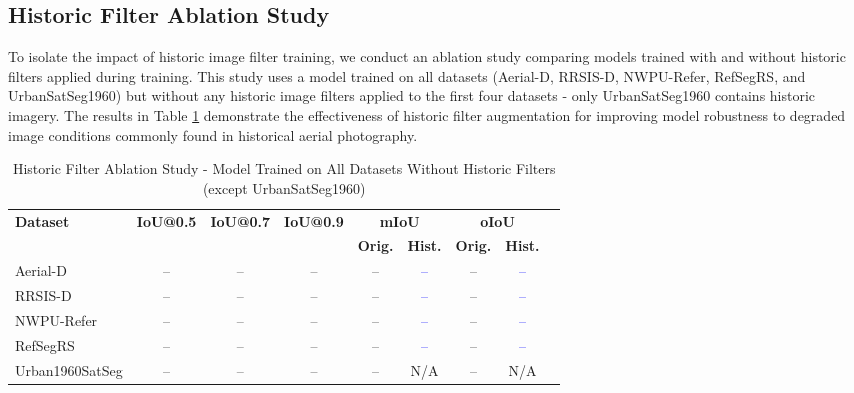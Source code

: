 \subsection{Historic Filter Ablation Study}
\label{subsec:historic_ablation}

To isolate the impact of historic image filter training, we conduct an ablation study comparing models trained with and without historic filters applied during training. This study uses a model trained on all datasets (Aerial-D, RRSIS-D, NWPU-Refer, RefSegRS, and UrbanSatSeg1960) but without any historic image filters applied to the first four datasets - only UrbanSatSeg1960 contains historic imagery. The results in Table \ref{tab:historic_ablation_results} demonstrate the effectiveness of historic filter augmentation for improving model robustness to degraded image conditions commonly found in historical aerial photography.

\begin{table}[t]
\centering
\caption{Historic Filter Ablation Study - Model Trained on All Datasets Without Historic Filters (except UrbanSatSeg1960)}
\label{tab:historic_ablation_results}
\begin{tabular}{@{}lcccccccc@{}}
\toprule
\textbf{Dataset} & \textbf{IoU@0.5} & \textbf{IoU@0.7} & \textbf{IoU@0.9} & \multicolumn{2}{c}{\textbf{mIoU}} & \multicolumn{2}{c}{\textbf{oIoU}} \\
\cmidrule(lr){5-6} \cmidrule(lr){7-8}
 & & & & \textbf{Orig.} & \textbf{Hist.} & \textbf{Orig.} & \textbf{Hist.} \\
\midrule
Aerial-D & -- & -- & -- & -- & \textcolor{blue}{--} & -- & \textcolor{blue}{--} \\
RRSIS-D & -- & -- & -- & -- & \textcolor{blue}{--} & -- & \textcolor{blue}{--} \\
NWPU-Refer & -- & -- & -- & -- & \textcolor{blue}{--} & -- & \textcolor{blue}{--} \\
RefSegRS & -- & -- & -- & -- & \textcolor{blue}{--} & -- & \textcolor{blue}{--} \\
Urban1960SatSeg & -- & -- & -- & -- & N/A & -- & N/A \\
\bottomrule
\end{tabular}
\end{table}

